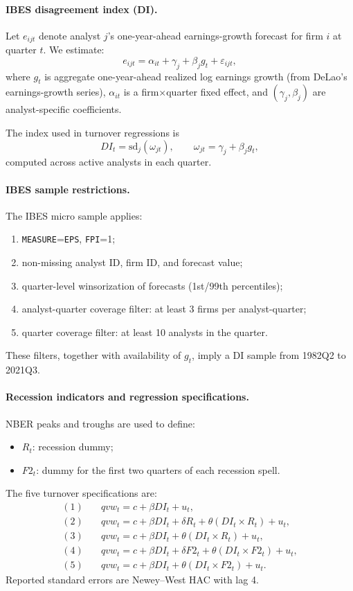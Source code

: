 \paragraph{IBES disagreement index (DI).}
Let \(e_{ijt}\) denote analyst \(j\)'s one-year-ahead earnings-growth forecast for firm \(i\) at quarter \(t\). We estimate:
\[
e_{ijt} = \alpha_{it} + \gamma_j + \beta_j g_t + \varepsilon_{ijt},
\]
where \(g_t\) is aggregate one-year-ahead realized log earnings growth (from DeLao's earnings-growth series), \(\alpha_{it}\) is a firm$\times$quarter fixed effect, and \((\gamma_j,\beta_j)\) are analyst-specific coefficients.

The index used in turnover regressions is
\[
DI_t = \text{sd}_j(\omega_{jt}), \qquad \omega_{jt}=\gamma_j+\beta_j g_t,
\]
computed across active analysts in each quarter.

\paragraph{IBES sample restrictions.}
The IBES micro sample applies:
\begin{enumerate}
\item \texttt{MEASURE}=\texttt{EPS}, \texttt{FPI}=1;
\item non-missing analyst ID, firm ID, and forecast value;
\item quarter-level winsorization of forecasts (1st/99th percentiles);
\item analyst-quarter coverage filter: at least 3 firms per analyst-quarter;
\item quarter coverage filter: at least 10 analysts in the quarter.
\end{enumerate}
These filters, together with availability of \(g_t\), imply a DI sample from 1982Q2 to 2021Q3.

\paragraph{Recession indicators and regression specifications.}
NBER peaks and troughs are used to define:
\begin{itemize}
\item \(R_t\): recession dummy;
\item \(F2_t\): dummy for the first two quarters of each recession spell.
\end{itemize}
The five turnover specifications are:
\begin{align*}
(1)\quad & qvw_t = c + \beta DI_t + u_t,\\
(2)\quad & qvw_t = c + \beta DI_t + \delta R_t + \theta (DI_t\times R_t)+u_t,\\
(3)\quad & qvw_t = c + \beta DI_t + \theta (DI_t\times R_t)+u_t,\\
(4)\quad & qvw_t = c + \beta DI_t + \delta F2_t + \theta (DI_t\times F2_t)+u_t,\\
(5)\quad & qvw_t = c + \beta DI_t + \theta (DI_t\times F2_t)+u_t.
\end{align*}
Reported standard errors are Newey--West HAC with lag 4.


